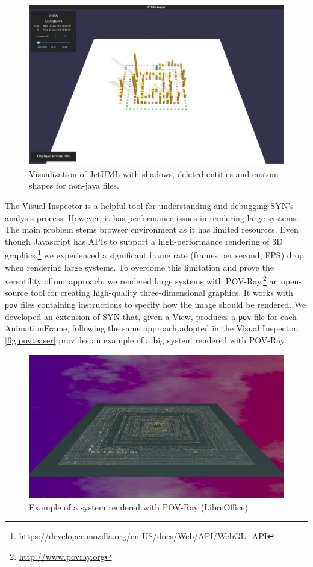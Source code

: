 \begin{figure}
    \center
    \includegraphics[width=\textwidth]{SYNUI-deletedshadow.png}
    \caption{Visualization of JetUML with shadows, deleted entities and custom shapes for non-java files.}
    \label{fig:deletedshadow}
\end{figure}


The Visual Inspector is a helpful tool for understanding and debugging SYN's analysis process. However, it has performance issues in rendering large systems. The main problem stems browser environment as it has limited resources. Even though Javascript has APIs to support a high-performance rendering of 3D graphics,\footnote{\url{https://developer.mozilla.org/en-US/docs/Web/API/WebGL_API}} we experienced a significant frame rate (frames per second, FPS) drop when rendering large systems. To overcome this limitation and prove the versatility of our approach, we rendered large systems with POV-Ray,\footnote{\url{http://www.povray.org}} an open-source tool for creating high-quality three-dimensional graphics. It works with \texttt{pov} files containing instructions to specify how the image should be rendered. We developed an extension of SYN that, given a View, produces a \texttt{pov} file for each AnimationFrame, following the same approach adopted in the Visual Inspector. \autoref{fig:povteaser} provides an example of a big system rendered with POV-Ray.

\begin{figure}
    \center
    \includegraphics[width=\textwidth]{LibreOfficeTeaser.png}
    \caption{Example of a system rendered with POV-Ray (LibreOffice). }
    \label{fig:povteaser}
\end{figure}


